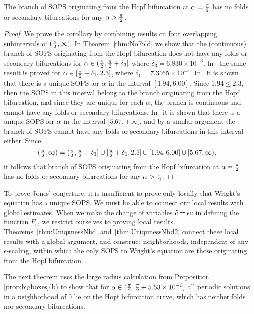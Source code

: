 \begin{corollary}\label{cor:collectreformulatedJones}
The branch of SOPS originating from the Hopf bifurcation at $\alpha = \tfrac{\pi}{2}$ has no folds or secondary bifurcations for any $\alpha > \tfrac{\pi}{2}$. 
\end{corollary}
\begin{proof}
	
	We prove the corollary by combining results on four overlapping subintervals of $ ( \tfrac{\pi}{2}, \infty)$. 
	In Theorem~\ref{thm:NoFold} we show that the (continuous) branch of SOPS originating from the Hopf bifurcation does not have any folds or secondary bifurcations for 
		$ \alpha \in ( \tfrac{\pi}{2}  , \tfrac{\pi}{2} + \delta_3] $ where 
 $ \delta_3 = 6.830  \times 10^{-3}$. 
	In~\cite{lessard2010recent} the same result is proved for $ \alpha \in [ \tfrac{\pi}{2} + \delta_1, 2.3]$, where $\delta_1 = 7.3165 \times 10^{-4}$. 
	In~\cite{jlm2016Floquet} 
	 it is shown that there is a unique SOPS  for $ \alpha $ in the interval $[1.94,6.00]$. 
	 Since $1.94 \leq 2.3$, then the SOPS in this interval belong to the branch originating from the Hopf bifurcation, and since they are unique for each $\alpha$, the branch is continuous and cannot have any folds or secondary bifurcations. 
	  In~\cite{xie1991thesis} it is shown that there is a unique SOPS for $ \alpha $ in the interval $ [5.67, +\infty)$, and by a similar argument the branch of SOPS cannot have any folds or secondary bifurcations in this interval either. 
	 Since 
	\[
	(\tfrac{\pi}{2}, \infty) = (\tfrac{\pi}{2}, \tfrac{\pi}{2} + \delta_3] \cup [ \tfrac{\pi}{2} + \delta_1,2.3] \cup [1.94,6.00] \cup [5.67, \infty) ,
	\]
	it follows that branch of SOPS originating from the Hopf bifurcation at $\alpha = \tfrac{\pi}{2}$ has no folds or secondary bifurcations for any $\alpha > \tfrac{\pi}{2}$. 
\end{proof}

To prove Jones' conjecture, it is insufficient to prove only locally that Wright's equation has a unique SOPS.  
We must be able to connect our local results with global estimates. 
When we make the change of variables $\tilde{c} = \epsilon c$ in defining the function $F_\epsilon$, we restrict ourselves to proving local results.  
Theorems~\ref{thm:UniqunessNbd} and~\ref{thm:UniqunessNbd2} connect these local results with a global argument, and construct neighborhoods, independent of any $ \epsilon$-scaling, within which the only SOPS to Wright's equation are those originating from the Hopf bifurcation.  

The next theorem uses the large radius calculation from Proposition \ref{prop:bigboxes}(b) to show that for  
$\alpha \in ( \tfrac{\pi}{2} , \tfrac{\pi}{2}+ 5.53 \times 10^{-3} ]$
all periodic solutions in a neighborhood of $0$ lie on the Hopf bifurcation curve, which has neither folds nor secondary bifurcations.  

